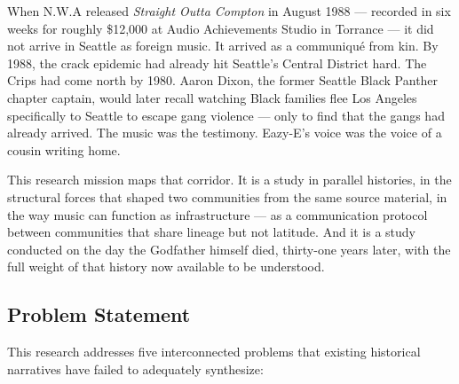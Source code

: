 \documentclass[11pt,letterpaper]{article}
\begin{document}
When N.W.A released \textit{Straight Outta Compton} in August 1988 --- recorded in six weeks for roughly \$12,000 at Audio Achievements Studio in Torrance --- it did not arrive in Seattle as foreign music. It arrived as a communiqué from kin. By 1988, the crack epidemic had already hit Seattle's Central District hard. The Crips had come north by 1980. Aaron Dixon, the former Seattle Black Panther chapter captain, would later recall watching Black families flee Los Angeles specifically to Seattle to escape gang violence --- only to find that the gangs had already arrived. The music was the testimony. Eazy-E's voice was the voice of a cousin writing home.

This research mission maps that corridor. It is a study in parallel histories, in the structural forces that shaped two communities from the same source material, in the way music can function as infrastructure --- as a communication protocol between communities that share lineage but not latitude. And it is a study conducted on the day the Godfather himself died, thirty-one years later, with the full weight of that history now available to be understood.

\subsection{Problem Statement}

This research addresses five interconnected problems that existing historical narratives have failed to adequately synthesize:
\end{document}
